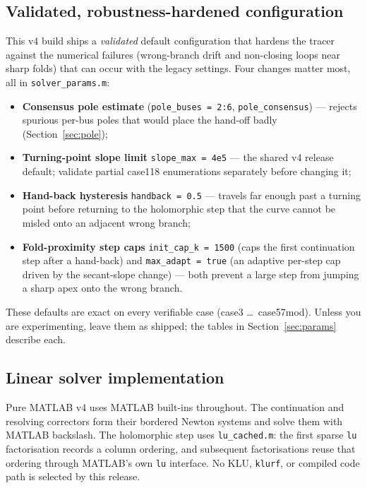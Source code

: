 \documentclass[11pt,a4paper]{article}
\newcommand{\code}[1]{\texttt{#1}}
\begin{document}
\subsection{Validated, robustness-hardened configuration}\label{sec:tuned}
This v4 build ships a \emph{validated} default configuration that hardens the tracer
against the numerical failures (wrong-branch drift and non-closing loops near sharp folds)
that can occur with the legacy settings. Four changes matter most, all in
\code{solver_params.m}:
\begin{itemize}[leftmargin=1.4em]
  \item \textbf{Consensus pole estimate} (\code{pole_buses = 2:6}, \code{pole_consensus})
        --- rejects spurious per-bus poles that would place the hand-off badly
        (Section~\ref{sec:pole});
  \item \textbf{Turning-point slope limit} \code{slope_max = 4e5} --- the shared v4
        release default; validate partial case118 enumerations separately before changing it;
  \item \textbf{Hand-back hysteresis} \code{handback = 0.5} --- travels far enough past a
        turning point before returning to the holomorphic step that the curve cannot be
        misled onto an adjacent wrong branch;
  \item \textbf{Fold-proximity step caps} \code{init_cap_k = 1500} (caps the first
        continuation step after a hand-back) and \code{max_adapt = true} (an adaptive
        per-step cap driven by the secant-slope change) --- both prevent a large step from
        jumping a sharp apex onto the wrong branch.
\end{itemize}
These defaults are exact on every verifiable case (case3 \dots\ case57mod). Unless you are
experimenting, leave them as shipped; the tables in Section~\ref{sec:params} describe each.

\subsection{Linear solver implementation}\label{sec:linear}
Pure MATLAB v4 uses MATLAB built-ins throughout. The continuation and resolving correctors
form their bordered Newton systems and solve them with MATLAB backslash. The holomorphic
step uses \code{lu_cached.m}: the first sparse \code{lu} factorisation records a column
ordering, and subsequent factorisations reuse that ordering through MATLAB's own \code{lu}
interface. No KLU, \code{klurf}, or compiled code path is selected by this release.
\end{document}
